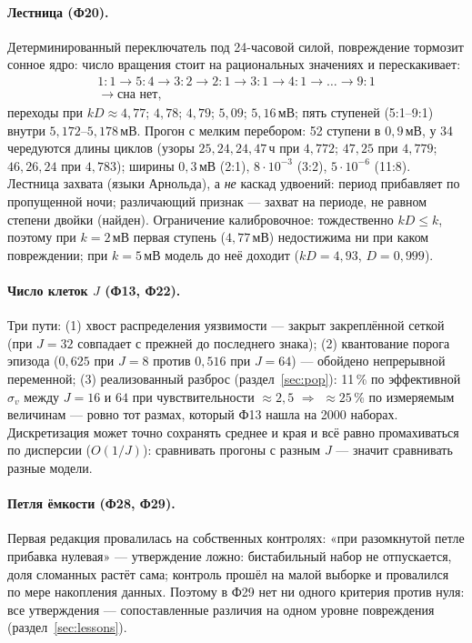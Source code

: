 \documentclass[11pt,a4paper]{article}
\theoremstyle{remark}
\begin{document}
\paragraph{Лестница (Ф20).}\label{sec:staircase}
Детерминированный переключатель под 24-часовой силой, повреждение тормозит сонное
ядро: число вращения стоит на рациональных значениях и перескакивает:
\begin{equation}\label{eq:stair}
\begin{gathered}
1{:}1\to5{:}4\to3{:}2\to2{:}1\to3{:}1\to4{:}1\to\dots\to9{:}1\\
\to\text{сна нет},
\end{gathered}
\end{equation}
переходы при $kD\approx4{,}77$; $4{,}78$; $4{,}79$; $5{,}09$; $5{,}16$\,мВ; пять
ступеней (5:1--9:1) внутри $5{,}172$--$5{,}178$\,мВ. Прогон с мелким перебором: 52
ступени в $0{,}9$\,мВ, у 34 чередуются длины циклов (узоры $25,24,24,47$\,ч при $4{,}772$;
$47,25$ при $4{,}779$; $46,26,24$ при $4{,}783$); ширины $0{,}3$\,мВ (2:1),
$8\cdot10^{-3}$ (3:2), $5\cdot10^{-6}$ (11:8). Лестница захвата (языки Арнольда), а
\emph{не} каскад удвоений: период прибавляет по пропущенной ночи; различающий признак
--- захват на периоде, не равном степени двойки (найден). Ограничение калибровочное:
тождественно $kD\le k$, поэтому при $k=2$\,мВ первая ступень ($4{,}77$\,мВ)
недостижима ни при каком повреждении; при $k=5$\,мВ модель до неё доходит
($kD=4{,}93$, $D=0{,}999$).

\paragraph{Число клеток $J$ (Ф13, Ф22).}\label{sec:J}
Три пути: (1) хвост распределения уязвимости --- закрыт закреплённой сеткой (при
$J=32$ совпадает с прежней до последнего знака); (2) квантование порога эпизода
($0{,}625$ при $J=8$ против $0{,}516$ при $J=64$) --- обойдено непрерывной
переменной; (3) реализованный разброс (раздел~\ref{sec:pop}): 11\,\% по эффективной
$\sigma_v$ между $J=16$ и $64$ при чувствительности $\approx2{,}5$ $\Rightarrow$
$\approx25$\,\% по измеряемым величинам --- ровно тот размах, который Ф13 нашла на
2000 наборах. Дискретизация может точно сохранять среднее и края и всё равно
промахиваться по дисперсии ($O(1/J)$): сравнивать прогоны с разным $J$ --- значит
сравнивать разные модели.

\paragraph{Петля ёмкости (Ф28, Ф29).} Первая редакция провалилась на собственных
контролях: «при разомкнутой петле прибавка нулевая» --- утверждение ложно: бистабильный
набор не отпускается, доля сломанных растёт сама; контроль прошёл на малой выборке и
провалился
по мере накопления данных. Поэтому в Ф29 нет ни одного критерия против нуля: все
утверждения --- сопоставленные различия на одном уровне повреждения
(раздел~\ref{sec:lessons}).
\end{document}
